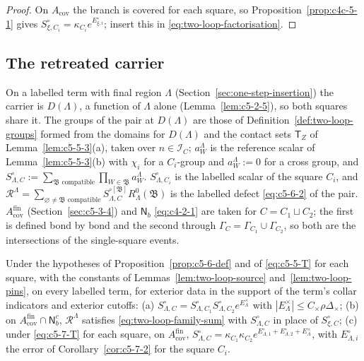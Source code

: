 \begin{proof}
On $A_{\mathrm{cov}}$ the branch is covered for each square, so Proposition~\ref{prop:c4c-5-1} gives $S^\circ_{\xi,C_i}=\kappa_{C_i}e^{E^\circ_{\xi,i}}$; insert this in \eqref{eq:two-loop-factorisation}.
\end{proof}

\subsection{The retreated carrier}\label{sec:two-loops-retreated}
On a labelled term with final region $\Lambda$ (Section~\ref{sec:one-step-insertion}) the carrier is $D(\Lambda)$, a function of $\Lambda$ alone (Lemma~\ref{lem:c5-2-5}), so both squares share it. The groups of the pair at $D(\Lambda)$ are those of Definition~\ref{def:two-loop-groups} formed from the domains for $D(\Lambda)$ and the contact sets $\mathsf T_Z$ of Lemma~\ref{lem:c5-5-3}(a), taken over $n\in\mathcal I_C$; $a^\Lambda_W$ is the reference scalar of Lemma~\ref{lem:c5-5-3}(b) with $\chi_i$ for a $C_i$-group and $a^\Lambda_W:=0$ for a cross group, and $S^\circ_{\Lambda,C}:=\sum_{\mathfrak B\text{ compatible}}\prod_{W\in\mathfrak B}a^\Lambda_W$. $S^\circ_{\Lambda,C_i}$ is the labelled scalar of the square $C_i$, and $\mathscr R^\Lambda=\sum_{\varnothing\neq\mathfrak B\text{ compatible}}S^{\circ[\mathfrak B]}_{\Lambda,C}R^0_\Lambda(\mathfrak B)$ is the labelled defect \eqref{eq:c5-6-2} of the pair. $A^{\mathrm{fin}}_{\mathrm{cov}}$ (Section~\ref{sec:c5-3-4}) and $\mathsf N_b$ \eqref{eq:c4-2-1} are taken for $C=C_1\sqcup C_2$; the first is defined bond by bond and the second through $\Gamma_C=\Gamma_{C_1}\cup\Gamma_{C_2}$, so both are the intersections of the single-square events.

\begin{lemma}\label{lem:two-loop-retreated}
Under the hypotheses of Proposition~\ref{prop:c5-6-def} and of \eqref{eq:c5-5-T} for each square, with the constants of Lemmas~\ref{lem:two-loop-source} and~\ref{lem:two-loop-pins}, on every labelled term, for exterior data in the support of the term's collar indicators and exterior cutoffs:
(a) $S^\circ_{\Lambda,C}=S^\circ_{\Lambda,C_1}S^\circ_{\Lambda,C_2}e^{E^\times_\Lambda}$ with $|E^\times_\Lambda|\leq C_\times\rho\Delta_\times$;
(b) on $A^{\mathrm{fin}}_{\mathrm{cov}}\cap\mathsf N_b^c$, $\mathscr R^\Lambda$ satisfies \eqref{eq:two-loop-family-sum} with $S^\circ_{\Lambda,C}$ in place of $S^\circ_{\xi,C}$;
(c) under \eqref{eq:c5-7-T} for each square, on $A^{\mathrm{fin}}_{\mathrm{cov}}$, $S^\circ_{\Lambda,C}=\kappa_{C_1}\kappa_{C_2}e^{E^\circ_{\Lambda,1}+E^\circ_{\Lambda,2}+E^\times_\Lambda}$, with $E^\circ_{\Lambda,i}$ the error of Corollary~\ref{cor:c5-7-2} for the square $C_i$.
\end{lemma}

